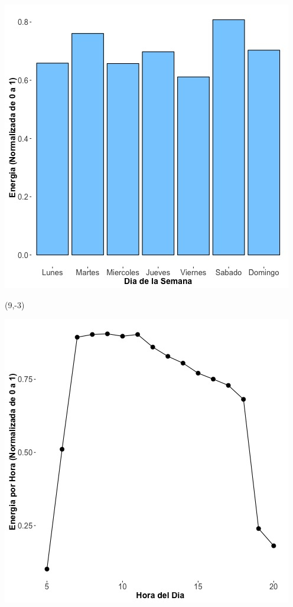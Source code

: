 \documentclass{article}\usepackage[]{graphicx}\usepackage[]{color}
\newenvironment{knitrout}{}{} %
\begin{document}
\begin{knitrout}
\color{fgcolor}
\includegraphics[scale=0.65]{figure/A16_day_of_week_plot} 
\end{knitrout}


 \begin{textblock}{1}(9,-3)
\begin{minipage}{20em}
\begingroup

\endgroup
\end{minipage}
\end{textblock}

 \vspace{2cm}

\begin{knitrout}
\color{fgcolor}
\includegraphics[scale=0.75]{figure/A16_fplot_norm_median} 
\end{knitrout}
\end{document}
